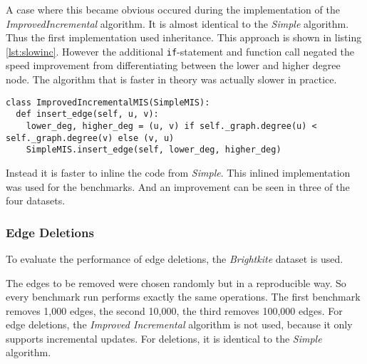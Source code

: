 \documentclass[letterpaper,11pt]{article}
\begin{document}



A case where this became obvious occured during the implementation of the
\textit{ImprovedIncremental} algorithm. It is almost identical to the
\textit{Simple} algorithm. Thus the first implementation used inheritance. This
approach is shown in listing \ref{lst:slowinc}. However the additional
\lstinline[]{if}-statement and function call negated the speed improvement from
differentiating between the lower and higher degree node. The algorithm that is
faster in theory was actually slower in practice.

\begin{lstlisting}[label={lst:slowinc}, caption={Slow implementation}]
class ImprovedIncrementalMIS(SimpleMIS):
  def insert_edge(self, u, v):
    lower_deg, higher_deg = (u, v) if self._graph.degree(u) < self._graph.degree(v) else (v, u)
    SimpleMIS.insert_edge(self, lower_deg, higher_deg)
\end{lstlisting}

Instead it is faster to inline the code from \textit{Simple}. This inlined implementation was used for the benchmarks. And an improvement can be seen in three
of the four datasets.


\subsubsection{Edge Deletions}
\label{sec:edgedeletion}

To evaluate the performance of edge deletions, the \textit{Brightkite}
\cite{konect:2016:loc-brightkite_edges, konect:cho2011, konect} dataset is used.

The edges to be removed were chosen randomly but in a reproducible way. So every
benchmark run performs exactly the same operations. The first benchmark removes
1,000 edges, the second 10,000, the third removes 100,000 edges. For edge
deletions, the \textit{Improved Incremental} algorithm is not used, because it
only supports incremental updates. For deletions, it is identical to the
\textit{Simple} algorithm.
\end{document}
